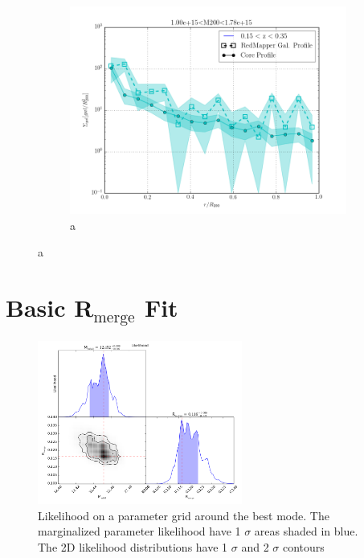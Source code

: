 \documentclass[twocolumn]{article}
\begin{document}
\begin{figure}
\begin{subfigure}{.5\textwidth}
    \centering\includegraphics[width=1.0\linewidth]{figs/cfn/basic_rd.param/plot_zmrs.py/fig6.png}
    \caption{a}
  \end{subfigure}
  
\end{figure}
\clearpage


\section{Basic R$_{\mathrm{merge}}$ Fit}

\begin{figure}[H]
  \center\includegraphics[width=0.6\textwidth]{figs/cfn/basic_rm.param/calc_likelihood_bounds.py/fig1.png}
  \caption{Likelihood on a parameter grid around the best mode. The marginalized parameter likelihood have
    1 $\sigma$ areas shaded in blue. The 2D likelihood distributions have 1 $\sigma$  and 2 $\sigma$ contours}
  \label{fig:basic_rm:likelihood}
\end{figure}
\end{document}
